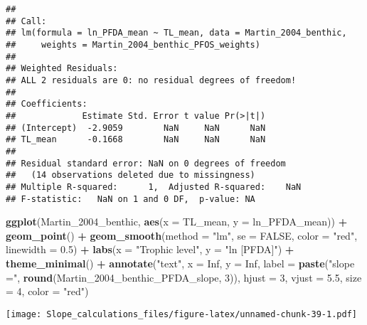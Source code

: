 \documentclass[
]{article}
\newenvironment{Shaded}{\begin{snugshade}}{\end{snugshade}}
\newcommand{\AttributeTok}[1]{\textcolor[rgb]{0.13,0.29,0.53}{#1}}
\newcommand{\ConstantTok}[1]{\textcolor[rgb]{0.56,0.35,0.01}{#1}}
\newcommand{\DecValTok}[1]{\textcolor[rgb]{0.00,0.00,0.81}{#1}}
\newcommand{\FloatTok}[1]{\textcolor[rgb]{0.00,0.00,0.81}{#1}}
\newcommand{\FunctionTok}[1]{\textcolor[rgb]{0.13,0.29,0.53}{\textbf{#1}}}
\newcommand{\NormalTok}[1]{#1}
\newcommand{\SpecialCharTok}[1]{\textcolor[rgb]{0.81,0.36,0.00}{\textbf{#1}}}
\newcommand{\StringTok}[1]{\textcolor[rgb]{0.31,0.60,0.02}{#1}}
\begin{document}
\begin{verbatim}
## 
## Call:
## lm(formula = ln_PFDA_mean ~ TL_mean, data = Martin_2004_benthic, 
##     weights = Martin_2004_benthic_PFOS_weights)
## 
## Weighted Residuals:
## ALL 2 residuals are 0: no residual degrees of freedom!
## 
## Coefficients:
##             Estimate Std. Error t value Pr(>|t|)
## (Intercept)  -2.9059        NaN     NaN      NaN
## TL_mean      -0.1668        NaN     NaN      NaN
## 
## Residual standard error: NaN on 0 degrees of freedom
##   (14 observations deleted due to missingness)
## Multiple R-squared:      1,  Adjusted R-squared:    NaN 
## F-statistic:   NaN on 1 and 0 DF,  p-value: NA
\end{verbatim}

\begin{Shaded}
\begin{Highlighting}[]
\FunctionTok{ggplot}\NormalTok{(Martin\_2004\_benthic, }\FunctionTok{aes}\NormalTok{(}\AttributeTok{x =}\NormalTok{ TL\_mean, }\AttributeTok{y =}\NormalTok{ ln\_PFDA\_mean)) }\SpecialCharTok{+}
  \FunctionTok{geom\_point}\NormalTok{() }\SpecialCharTok{+}
  \FunctionTok{geom\_smooth}\NormalTok{(}\AttributeTok{method =} \StringTok{"lm"}\NormalTok{, }\AttributeTok{se =} \ConstantTok{FALSE}\NormalTok{, }\AttributeTok{color =} \StringTok{"red"}\NormalTok{, }\AttributeTok{linewidth =} \FloatTok{0.5}\NormalTok{) }\SpecialCharTok{+}
  \FunctionTok{labs}\NormalTok{(}\AttributeTok{x =} \StringTok{"Trophic level"}\NormalTok{,}
       \AttributeTok{y =} \StringTok{"ln [PFDA]"}\NormalTok{) }\SpecialCharTok{+}
  \FunctionTok{theme\_minimal}\NormalTok{() }\SpecialCharTok{+}
  \FunctionTok{annotate}\NormalTok{(}\StringTok{"text"}\NormalTok{, }\AttributeTok{x =} \ConstantTok{Inf}\NormalTok{, }\AttributeTok{y =} \ConstantTok{Inf}\NormalTok{, }\AttributeTok{label =} \FunctionTok{paste}\NormalTok{(}\StringTok{"slope ="}\NormalTok{, }\FunctionTok{round}\NormalTok{(Martin\_2004\_benthic\_PFDA\_slope, }\DecValTok{3}\NormalTok{)), }
           \AttributeTok{hjust =} \DecValTok{3}\NormalTok{, }\AttributeTok{vjust =} \FloatTok{5.5}\NormalTok{, }\AttributeTok{size =} \DecValTok{4}\NormalTok{, }\AttributeTok{color =} \StringTok{"red"}\NormalTok{)}
\end{Highlighting}
\end{Shaded}

\texttt{[image: Slope\_calculations\_files/figure-latex/unnamed-chunk-39-1.pdf]}
\end{document}
